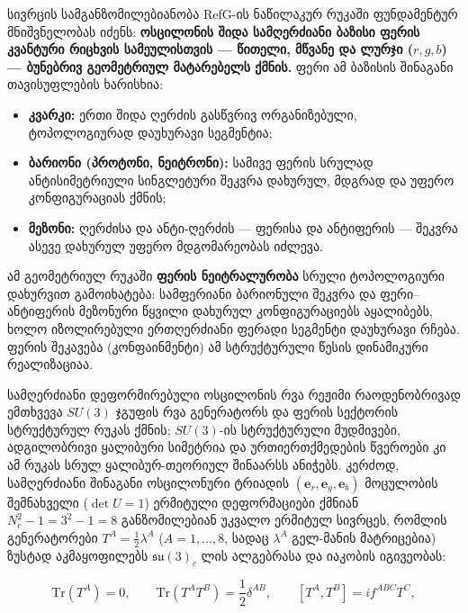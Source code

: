 \documentclass[11pt,a4paper]{article}
\begin{document}
სივრცის სამგანზომილებიანობა RefG-ის ნაწილაკურ რუკაში ფუნდამენტურ მნიშვნელობას იძენს: \textbf{ოსცილონის შიდა სამღერძიანი ბაზისი ფერის კვანტური რიცხვის სამეულისთვის — წითელი, მწვანე და ლურჯი ($r,g,b$) — ბუნებრივ გეომეტრიულ მატარებელს ქმნის.} ფერი ამ ბაზისის შინაგანი თავისუფლების ხარისხია:

\begin{itemize}
\item \textbf{კვარკი:} ერთი შიდა ღერძის გასწვრივ ორგანიზებული, ტოპოლოგიურად დაუხურავი სეგმენტია;
\item \textbf{ბარიონი (პროტონი, ნეიტრონი):} სამივე ფერის სრულად ანტისიმეტრიული სინგლეტური შეკვრა დახურულ, მდგრად და უფერო კონფიგურაციას ქმნის;
\item \textbf{მეზონი:} ღერძისა და ანტი-ღერძის — ფერისა და ანტიფერის — შეკვრა ასევე დახურულ უფერო მდგომარეობას იძლევა.

\end{itemize}
ამ გეომეტრიულ რუკაში \textbf{ფერის ნეიტრალურობა} სრული ტოპოლოგიური დახურვით გამოიხატება: სამფერიანი ბარიონული შეკვრა და ფერი–ანტიფერის მეზონური წყვილი დახურულ კონფიგურაციებს აყალიბებს, ხოლო იზოლირებული ერთღერძიანი ფერადი სეგმენტი დაუხურავი რჩება. ფერის შეკავება (კონფაინმენტი) ამ სტრუქტურული წესის დინამიკური რეალიზაციაა.

სამღერძიანი დეფორმირებული ოსცილონის რვა რეჟიმი რაოდენობრივად ემთხვევა $SU(3)$ ჯგუფის რვა გენერატორს და ფერის სექტორის სტრუქტურულ რუკას ქმნის; $SU(3)$-ის სტრუქტურული მუდმივები, ადგილობრივი ყალიბური სიმეტრია და ურთიერთქმედების წვეროები კი ამ რუკას სრულ ყალიბურ-თეორიულ შინაარსს ანიჭებს. კერძოდ, სამღერძიანი შინაგანი ოსცილონური ტრიადის $(\mathbf{e}_r, \mathbf{e}_g, \mathbf{e}_b)$ მოცულობის შემნახველი ($\det U = 1$) ერმიტული დეფორმაციები ქმნიან $N_c^2 - 1 = 3^2 - 1 = 8$ განზომილებიან უკვალო ერმიტულ სივრცეს, რომლის გენერატორები $T^A = \frac{1}{2}\lambda^A$ ($A = 1,\dots,8$, სადაც $\lambda^A$ გელ-მანის მატრიცებია) ზუსტად აკმაყოფილებს $\mathfrak{su}(3)_c$ ლის ალგებრასა და იაკობის იგივეობას:

\[
\mathrm{Tr}(T^A) = 0, \qquad \mathrm{Tr}(T^A T^B) = \frac{1}{2}\delta^{AB}, \qquad [T^A, T^B] = i f^{ABC} T^C,
\]
\end{document}
